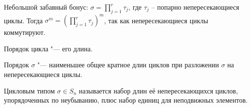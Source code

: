 \begin{Rem}
Небольшой забавный бонус:
$\sigma = \prod_{j = 1}^r \tau_j$, где $\tau_j$ -- попарно непересекающиеся циклы. Тогда $\sigma^m = (\prod_{j = 1}^r \tau_j)^m$, так как непересекающиеся циклы коммутируют.\\
\end{Rem}

\begin{Def}
Порядок цикла "--- его длина.
\end{Def}
\begin{Rem}
Порядок $\sigma$ "--- наименьшее общее кратное длин циклов при разложении $\sigma$ на непересекающиеся циклы.
\end{Rem}
\begin{Def}
Цикловым типом $\sigma \in S_n$ называется набор длин её непересекающихся циклов, упорядоченных по неубыванию, плюс набор единиц для неподвижных элементов.
\end{Def}
